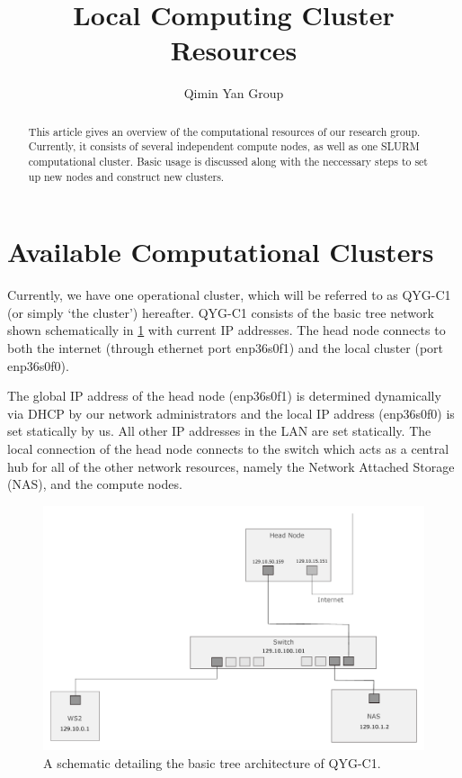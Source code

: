 \documentclass[]{article}
\title{Local Computing Cluster Resources}
\author{Qimin Yan Group}
\begin{document}
\maketitle

\begin{abstract}
	This article gives an overview of the computational resources of our research group. Currently, it consists of several independent compute nodes, as well as one SLURM computational cluster. Basic usage is discussed along with the neccessary steps to set up new nodes and construct new clusters.
\end{abstract}

\tableofcontents

\section{Available Computational Clusters}

Currently, we have one operational cluster, which will be referred to as QYG-C1 (or simply `the cluster') hereafter. QYG-C1 consists of the basic tree network shown schematically in \cref{qyg-c1-schematic} with current IP addresses. The head node connects to both the internet (through ethernet port enp36s0f1) and the local cluster (port enp36s0f0).

The global IP address of the head node (enp36s0f1) is determined dynamically via DHCP by our network administrators and the local IP address (enp36s0f0) is set statically by us. All other IP addresses in the LAN are set statically. The local connection of the head node connects to the switch which acts as a central hub for all of the other network resources, namely the Network Attached Storage (NAS), and the compute nodes. 


\begin{figure}[h!]
	\centering
	\includegraphics[scale=0.35]{qyg-c1-schem.pdf}
	\caption{A schematic detailing the basic tree architecture of QYG-C1.}\label{qyg-c1-schematic}
\end{figure}
\end{document}
